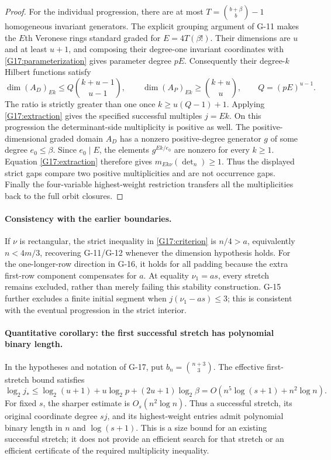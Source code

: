 \documentclass[11pt,a4paper]{article}
\theoremstyle{definition}\newtheorem{definition}{Definition}
\begin{document}
\begin{proof}
For the individual progression, there are at most
$T=\binom{b+\beta}{b}-1$ homogeneous invariant generators.
The explicit grouping argument of G-11 makes the $E$th Veronese
rings standard graded for $E=4T(\beta!)$.
Their dimensions are $u$ and at least $u+1$, and composing their
degree-one invariant coordinates with \eqref{G17:parameterization}
gives parameter degree $pE$. Consequently their degree-$k$ Hilbert
functions satisfy
\[
 \dim(A_D)_{Ek}\leq Q\binom{k+u-1}{u-1},\qquad
 \dim(A_P)_{Ek}\geq\binom{k+u}{u},\qquad Q=(pE)^{u-1}.
\]
The ratio is strictly greater than one once
$k\geq u(Q-1)+1$. Applying \eqref{G17:extraction} gives the
specified successful multiples $j=Ek$.
On this progression the determinant-side multiplicity is positive as
well. The positive-dimensional graded domain $A_D$ has a nonzero
positive-degree generator $g$ of some degree $e_0\leq\beta$.
Since $e_0\mid E$, the elements $g^{Ek/e_0}$ are nonzero for every
$k\geq1$. Equation \eqref{G17:extraction} therefore gives
$m_{Ek\nu}(\det_n)\geq1$. Thus the displayed strict gaps compare
two positive multiplicities and are not occurrence gaps.
Finally the four-variable highest-weight restriction transfers
all the multiplicities back to the full orbit closures.
\end{proof}

\paragraph{Consistency with the earlier boundaries.}
If $\nu$ is rectangular, the strict inequality in
\eqref{G17:criterion} is $n/4>a$, equivalently $n<4m/3$,
recovering G-11/G-12 whenever the dimension hypothesis holds.
For the one-longer-row direction in G-16, it holds for all padding
because the extra first-row component compensates for $a$.
At equality $\nu_1=as$, every stretch remains excluded, rather
than merely failing this stability construction.
G-15 further excludes a finite initial segment when
$j(\nu_1-as)\leq3$; this is consistent with the eventual
progression in the strict interior.


\paragraph{Quantitative corollary: the first successful stretch has polynomial binary length.}
In the hypotheses and notation of G-17, put
$b_n=\binom{n+3}{3}$. The effective first-stretch bound satisfies
\begin{equation}\label{G17:bitlength}
 \log_2j_*
 \leq\log_2(u+1)+u\log_2p+(2u+1)\log_2\beta
 =O\!\left(n^5\log(s+1)+n^2\log n\right).
\end{equation}
For fixed $s$, the sharper estimate is $O_s(n^2\log n)$.
Thus a successful stretch, its original coordinate degree $sj$, and
its highest-weight entries admit polynomial binary length in $n$ and
$\log(s+1)$. This is a size bound for an existing successful stretch;
it does not provide an efficient search for that stretch or an efficient
certificate of the required multiplicity inequality.
\end{document}
